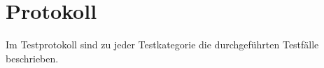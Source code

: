 %



\newpage



\section{Protokoll}
\label{Abschnitt:Tests:Protokoll}

Im Testprotokoll sind zu jeder Testkategorie die durchgeführten Testfälle beschrieben.








